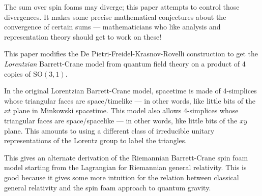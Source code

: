 \documentclass{article}
\def\tightlist{}
\renewcommand{\texttt}[1]{%
  \begingroup
  \ttfamily
  \begingroup\lccode`~=`/\lowercase{\endgroup\def~}{/\discretionary{}{}{}}%
  \begingroup\lccode`~=`[\lowercase{\endgroup\def~}{[\discretionary{}{}{}}%
  \begingroup\lccode`~=`.\lowercase{\endgroup\def~}{.\discretionary{}{}{}}%
  \catcode`/=\active\catcode`[=\active\catcode`.=\active
  \scantokens{#1\noexpand}%
  \endgroup
}
\begin{document}
The sum over spin foams may diverge; this paper attempts to control
those divergences. It makes some precise mathematical conjectures about
the convergence of certain sums --- mathematicians who like analysis and
representation theory should get to work on these!


This paper modifies the De Pietri-Freidel-Krasnov-Rovelli construction
to get the \emph{Lorentzian} Barrett-Crane model from quantum field
theory on a product of 4 copies of \(\mathrm{SO}(3,1)\).


In the original Lorentzian Barrett-Crane model, spacetime is made of
4-simplices whose triangular faces are space/timelike --- in other
words, like little bits of the \(xt\) plane in Minkowski spacetime. This
model also allows 4-simplices whose triangular faces are space/spacelike
--- in other words, like little bits of the \(xy\) plane. This amounts
to using a different class of irreducible unitary representations of the
Lorentz group to label the triangles.


This gives an alternate derivation of the Riemannian Barrett-Crane spin
foam model starting from the Lagrangian for Riemannian general
relativity. This is good because it gives some more intuition for the
relation between classical general relativity and the spin foam approach
to quantum gravity.
\end{document}
